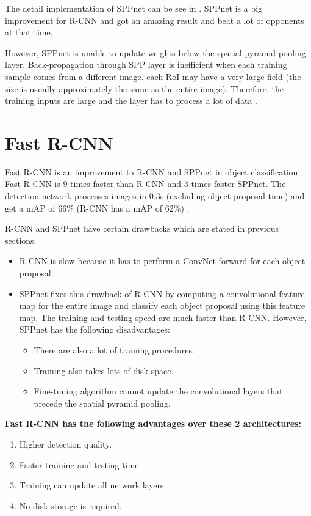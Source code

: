 \documentclass{article}
\begin{document}
The detail implementation of SPPnet can be see in \cite{arxiv/sppnet}. SPPnet is a big improvement for R-CNN and got an amazing result and beat a lot of opponents at that time.

However, SPPnet is unable to update weights below the spatial pyramid pooling layer. Back-propagation through SPP layer is inefficient when each training sample comes from a different image. each RoI may have a very large field (the size is usually approximately the same as the entire image). Therefore, the training inputs are large and the layer has to process a lot of data \cite{arxiv/faster-rcnn}.

\section{Fast R-CNN}

Fast R-CNN is an improvement to R-CNN and SPPnet in object classification. Fast R-CNN is 9 times faster than R-CNN and 3 times faster SPPnet. The detection network processes images in 0.3s (excluding object proposal time) and get a mAP of 66\% (R-CNN has a mAP of 62\%) \cite{arxiv/fast-rcnn}.

R-CNN and SPPnet have certain drawbacks which are stated in previous sections.
\begin{itemize}
	\item R-CNN is slow because it has to perform a ConvNet forward for each object proposal \cite{arxiv/fast-rcnn}.
	\item SPPnet fixes this drawback of R-CNN by computing a convolutional feature map for the entire image and classify each object proposal using this feature map. The training and testing speed are much faster than R-CNN. However, SPPnet has the following disadvantages:
	\begin{itemize}
		\item There are also a lot of training procedures.
		\item Training also takes lots of disk space.
		\item Fine-tuning algorithm cannot update the convolutional layers that precede the spatial pyramid pooling.
	\end{itemize}
\end{itemize}

\noindent \textbf{Fast R-CNN has the following advantages over these 2 architectures:}
\begin{enumerate}
	\item Higher detection quality.
	\item Faster training and testing time.
	\item Training can update all network layers.
	\item No disk storage is required.
\end{enumerate}
\end{document}
